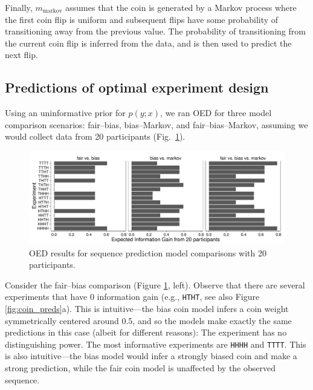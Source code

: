 \documentclass{article}
\begin{document}
Finally, $m_{\text{markov}}$ assumes that the coin is generated by a Markov process where the first coin flip is uniform and subsequent flips have some probability of transitioning away from the previous value.
The probability of transitioning from the current coin flip is inferred from the data, and is then used to predict the next flip.


\subsection{Predictions of optimal experiment design}

Using an uninformative prior for $p(y; x)$, we ran OED for three model comparison scenarios: fair--bias, bias--Markov, and fair--bias--Markov, assuming we would collect data from 20 participants (Fig.~\ref{fig:run-coin}).

\begin{figure}[h]
\includegraphics[width=\columnwidth]{img/coin_eig_n20_ignorance.pdf}
\caption{OED results for sequence prediction model comparisons with 20 participants.}
\label{fig:run-coin}
\end{figure}
Consider the fair--bias comparison (Figure \ref{fig:run-coin}, left).
Observe that there are several experiments that have 0 information gain (e.g., \lstinline{HTHT}, see also Figure \ref{fig:coin_preds}a).
This is intuitive---the bias coin model infers a coin weight symmetrically centered around 0.5, and so the models make exactly the same predictions in this case (albeit for different reasons): The experiment has no distinguishing power.
The most informative experiments are \lstinline{HHHH} and \lstinline{TTTT}.
This is also intuitive---the bias model would infer a strongly biased coin and make a strong prediction, while the fair coin model is unaffected by the observed sequence.
\end{document}
